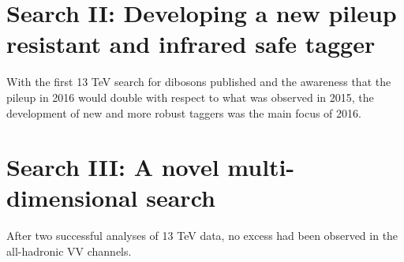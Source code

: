 \vspace*{\fill}\newpage


\vspace*{\fill}\newpage
\vspace*{\fill}
\section{Search II: Developing a new pileup resistant and infrared safe tagger}
With the first 13 TeV search for dibosons published and the awareness that the pileup in 2016 would double with respect to what was observed in 2015, the development of new and more robust taggers was the main focus of 2016. 
\vspace*{\fill}\newpage


\vspace*{\fill}\newpage
\vspace*{\fill}
\section{Search III: A novel multi-dimensional search}
After two successful analyses of 13 TeV data, no excess had been observed in the all-hadronic VV channels.
\vspace*{\fill}\newpage




